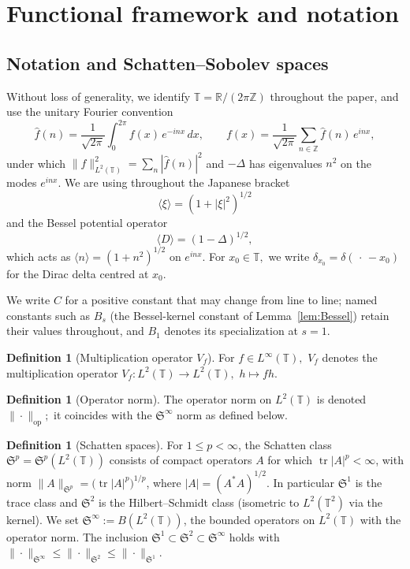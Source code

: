 \documentclass[11pt]{amsart}
\theoremstyle{definition}
\newtheorem{definition}[theorem]{Definition}
\newcommand{\R}{\mathbb{R}}
\newcommand{\T}{\mathbb{T}}
\newcommand{\Z}{\mathbb{Z}}
\newcommand{\Sp}{\mathfrak{S}}
\DeclareMathOperator{\tr}{tr}
\begin{document}
\section{Functional framework and notation}\label{sec:framework}

\subsection{Notation and Schatten--Sobolev spaces}\label{subsec:notation}

Without loss of generality, we identify $\T = \R/(2\pi\Z)$ throughout the paper, and use the unitary Fourier convention
\[
  \hat f(n) = \frac{1}{\sqrt{2\pi}}\int_0^{2\pi} f(x)\,e^{-inx}\,dx,
  \qquad
  f(x) = \frac{1}{\sqrt{2\pi}}\sum_{n\in\Z}\hat f(n)\,e^{inx},
\]
under which $\|f\|_{L^2(\T)}^2 = \sum_n|\hat f(n)|^2$ and $-\Delta$ has eigenvalues $n^2$ on the modes $e^{inx}.$ We are using throughout the Japanese bracket
\[
\langle\xi\rangle=(1+|\xi|^2)^{1/2}
\]
and  the Bessel potential operator
\[
\langle D\rangle=(1-\Delta)^{1/2},
\]
which acts as $\langle n\rangle = (1+n^2)^{1/2}$ on $e^{inx}.$ For $x_0\in\T,$ we write $\delta_{x_0}=\delta(\,\cdot\,-x_0)$ for the Dirac delta centred at $x_0.$

We write $C$ for a positive constant that may change from line to line; named constants such as $B_s$ (the Bessel-kernel constant of Lemma~\ref{lem:Bessel}) retain their values throughout, and $B_1$ denotes its specialization at $s=1.$%

\begin{definition}[Multiplication operator $V_f$]\label{def:Vf}
For $f\in L^\infty(\T),$ $V_f$ denotes the multiplication operator $V_f:L^2(\T)\to L^2(\T),$ $h\mapsto fh.$
\end{definition}

\begin{definition}[Operator norm]\label{def:op_norm}
The operator norm on $L^2(\T)$ is denoted $\|\cdot\|_{\mathrm{op}};$ it coincides with the $\Sp^\infty$ norm as defined below.
\end{definition}



\begin{definition}[Schatten spaces]
For $1\le p<\infty$, the Schatten class $\Sp^p=\Sp^p(L^2(\T))$ consists of compact operators $A$ for which $\tr|A|^p<\infty$, with norm $\|A\|_{\Sp^p}=\bigl(\tr|A|^p\bigr)^{1/p}$, where $|A|=(A^*A)^{1/2}.$ In particular $\Sp^1$ is the trace class and $\Sp^2$ is the Hilbert--Schmidt class (isometric to $L^2(\T^2)$ via the kernel). We set $\Sp^\infty:=B(L^2(\T))$, the bounded operators on $L^2(\T)$ with the operator norm. The inclusion $\Sp^1\subset\Sp^2\subset\Sp^\infty$ holds with $\|\cdot\|_{\Sp^\infty} \le\|\cdot\|_{\Sp^2} \le\|\cdot\|_{\Sp^1}$.
\end{definition}
\end{document}
